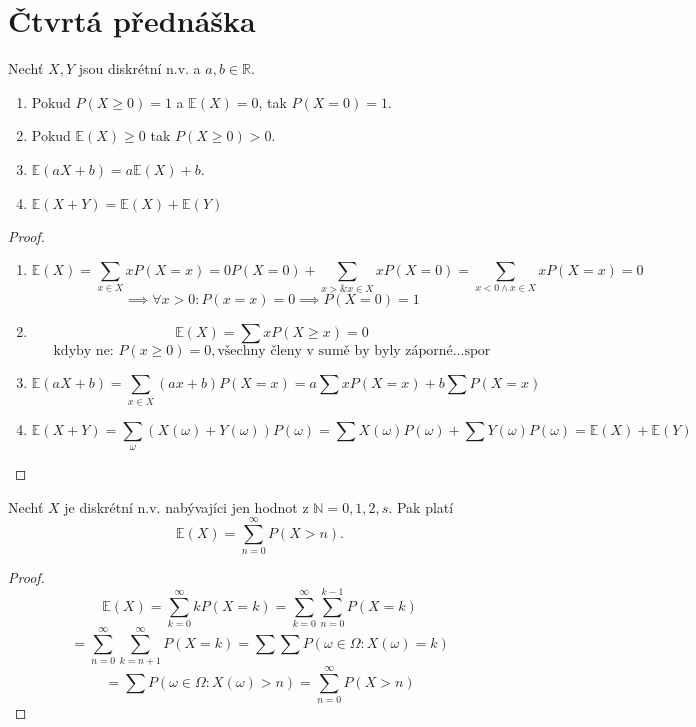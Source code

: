 \documentclass[../main.tex]{subfiles}
\begin{document}
\section{Čtvrtá přednáška}

\begin{theorem}
    Nechť $X,Y$ jsou diskrétní n.v. a $a,b \in \mathbb{R}$.
    \begin{enumerate}
        \item Pokud $P(X\geq 0) = 1$ a $\mathbb{E}(X) = 0$, tak $P(X=0)=1$.
        \item Pokud $\mathbb{E}(X) \geq 0$ tak $P(X\geq 0) > 0.$
        \item $\mathbb{E}(a X + b) = a \mathbb{E}(X) + b$.
        \item $\mathbb{E}(X+Y) = \mathbb{E}(X) + \mathbb{E}(Y)$
    \end{enumerate}
\end{theorem}
\begin{proof}
\begin{enumerate}
    \item
    \[\mathbb{E}(X) = \sum_{x \in X} x  P(X = x) = 0  P(X = 0) + \sum_{x > \& x \in X} x  P(X = 0) = 
    \sum_{x<0 \land x\in X} x P(X=x) = 0\]
    \[\implies \forall x > 0 : P(x = x) = 0 \implies P(X = 0) = 1\]
    \item
    \[\mathbb{E}(X) = \sum x P(X\geq x) = 0\]
    \[\text{kdyby ne: } P(x\geq 0) = 0, \text{všechny členy v sumě by byly záporné...spor}\]
    \item
    \[\mathbb{E}(a X+b) = \sum_{x\in X} (a x + b)P(X=x) = a\sum xP(X=x) + b\sum P(X=x)\]
    \item
    \[\mathbb{E}(X+Y) = \sum_{\omega}(X(\omega)+Y(\omega))P({\omega}) = \sum X(\omega)P({\omega})
    + \sum Y(\omega)P({\omega}) = \mathbb{E}(X) + \mathbb{E}(Y)\]
\end{enumerate}
\end{proof}

\begin{theorem}
    Nechť $X$ je diskrétní n.v. nabývajíci jen hodnot z $\mathbb{N} = {0,1,2,s}$. Pak platí
    \[\mathbb{E}(X) = \sum^\infty_{n = 0} P(X>n).\]
\end{theorem}
\begin{proof}
    \[\mathbb{E}(X) = \sum^\infty_{k=0} kP(X=k) = \sum^\infty_{k=0} \sum^{k-1}_{n=0} P(X=k)\]
    \[= \sum_{n=0}^\infty \sum_{k=n+1}^\infty P(X=k) = \sum \sum P({\omega \in \Omega : X(\omega) = k})\]
    \[= \sum P({\omega \in \Omega : X(\omega) > n}) = \sum^\infty_{n=0} P(X>n)\]
\end{proof}
\end{document}
